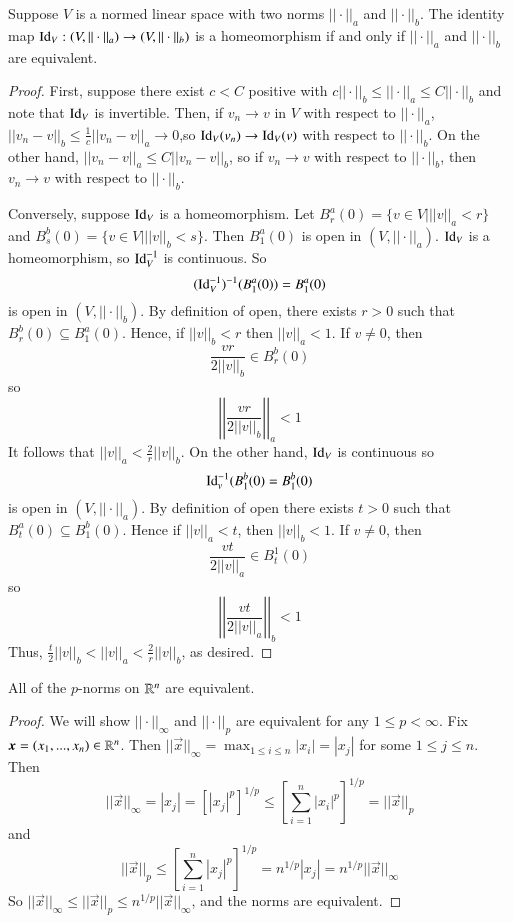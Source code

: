 \begin{prop}
    Suppose $V$ is a normed linear space with two norms $||\cdot||_a$ and $||\cdot||_b$. The identity map $\operatorname{Id}_V:(V,||\cdot||_a)\rightarrow (V,||\cdot||_b)$ is a homeomorphism if and only if $||\cdot||_a$ and $||\cdot||_b$ are equivalent.
\end{prop}
\begin{proof}
    First, suppose there exist $c < C$ positive with $c||\cdot||_b\leq ||\cdot||_a\leq C||\cdot||_b$ and note that $\operatorname{Id}_V$ is invertible. Then, if $v_n\rightarrow v$ in $V$ with respect to $||\cdot||_a$, $||v_n-v||_b\leq \frac{1}{c}||v_n-v||_a\rightarrow 0$,so $\operatorname{Id}_V(v_n)\rightarrow \operatorname{Id}_V(v)$ with respect to $||\cdot||_b$. On the other hand, $||v_n-v||_a\leq C||v_n-v||_b$, so if $v_n\rightarrow v$ with respect to $||\cdot||_b$, then $v_n\rightarrow v$ with respect to $||\cdot||_b$.

    Conversely, suppose $\operatorname{Id}_V$ is a homeomorphism. Let $B_r^a(0) = \{v \in V\vert||v||_a < r\}$ and $B_s^b(0) = \{v \in V\vert||v||_b < s\}$. Then $B_1^a(0)$ is open in $(V,||\cdot||_a)$. $\operatorname{Id}_V$ is a homeomorphism, so $\operatorname{Id}_V^{-1}$ is continuous. So $$(\operatorname{Id}_V^{-1})^{-1}(B_1^a(0)) = B_1^a(0)$$ is open in $(V,||\cdot||_b)$. By definition of open, there exists $r > 0$ such that $B_r^b(0) \subseteq B_1^a(0)$. Hence, if $||v||_b < r$ then $||v||_a < 1$. If $v\neq 0$, then $$\frac{vr}{2||v||_b} \in B_r^b(0)$$ so $$\left|\left|\frac{vr}{2||v||_b}\right|\right|_a < 1$$ It follows that $||v||_a < \frac{2}{r}||v||_b$. On the other hand, $\operatorname{Id}_V$ is continuous so $$\operatorname{Id}_v^{-1}(B_1^b(0) = B_1^b(0)$$ is open in $(V,||\cdot||_a)$. By definition of open there exists $t > 0$ such that $B_t^a(0) \subseteq B_1^b(0)$. Hence if $||v||_a < t$, then $||v||_b < 1$. If $v \neq 0$, then $$\frac{vt}{2||v||_a} \in B_t^1(0)$$ so $$\left|\left|\frac{vt}{2||v||_a}\right|\right|_b < 1$$ Thus, $\frac{t}{2}||v||_b < ||v||_a < \frac{2}{r}||v||_b$, as desired.
\end{proof}

\begin{prop}
    All of the $p$-norms on $\mathbb R^n$ are equivalent.
\end{prop}
\begin{proof}
    We will show $||\cdot||_{\infty}$ and $||\cdot||_p$ are equivalent for any $1 \leq p < \infty$. Fix $\vec{x} = (x_1,...,x_n) \in \R^n$. Then $||\vec{x}||_{\infty} = \max_{1\leq i\leq n}|x_i| = |x_j|$ for some $1 \leq j \leq n$. Then $$||\vec{x}||_{\infty} = |x_j| = [|x_j|^p]^{1/p} \leq \left[\sum_{i=1}^n|x_i|^p\right]^{1/p} = ||\vec{x}||_p$$ and $$||\vec{x}||_p \leq \left[\sum_{i=1}^n|x_j|^p\right]^{1/p} = n^{1/p}|x_j| = n^{1/p}||\vec{x}||_{\infty}$$ So $||\vec{x}||_{\infty} \leq ||\vec{x}||_p\leq n^{1/p}||\vec{x}||_{\infty}$, and the norms are equivalent.
\end{proof}

